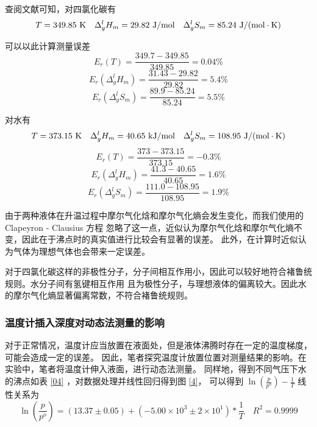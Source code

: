 \documentclass[cn,hazy,pku,12pt,normal,math=newtx,cite=super]{elegantnote}
\begin{document}
查阅文献\cite{Weast1988CRC}可知，对四氯化碳有
$$
T = 349.85\ {\rm K} \quad \Delta^l_g H_m = 29.82\ {\rm J/mol} \quad \Delta^l_g S_m = 85.24\ {\rm J/(mol\cdot K)}
$$

可以以此计算测量误差
$$
E_r(T) = \frac{349.7-349.85}{349.85} = 0.04 \%
$$
$$
E_r(\Delta^l_g H_m) = \frac{31.43-29.82}{29.82} = 5.4 \% 
$$
$$
E_r(\Delta^l_g S_m) = \frac{89.9 -85.24}{85.24} = 5.5 \% 
$$

对水有
$$
T = 373.15\ {\rm K} \quad \Delta^l_g H_m = 40.65\ {\rm kJ/mol} \quad \Delta^l_g S_m = 108.95\ {\rm J/(mol\cdot K)}
$$
$$
E_r(T) = \frac{373 - 373.15}{373.15} = -0.3 \%
$$
$$
E_r(\Delta^l_g H_m) = \frac{41.3-40.65}{40.65} = 1.6 \% 
$$
$$
E_r(\Delta^l_g S_m) = \frac{111.0-108.95}{108.95} = 1.9 \% 
$$

由于两种液体在升温过程中摩尔气化焓和摩尔气化熵会发生变化，而我们使用的 Clapeyron - Clausius 方程
忽略了这一点，近似认为摩尔气化焓和摩尔气化熵不变，因此在于沸点时的真实值进行比较会有显著的误差。
此外，在计算时近似认为气体为理想气体也会带来一定误差。

对于四氯化碳这样的非极性分子，分子间相互作用小，因此可以较好地符合褚鲁统规则。水分子间有氢键相互作用
且为极性分子，与理想液体的偏离较大。因此水的摩尔气化熵显著偏离常数，不符合褚鲁统规则。

\subsubsection{温度计插入深度对动态法测量的影响}

对于正常情况，温度计应当放置在液面处，但是液体沸腾时存在一定的温度梯度，可能会造成一定的误差。
因此，笔者探究温度计放置位置对测量结果的影响。在实验中，笔者将温度计伸入液面，进行动态法测量。
同样地，得到不同气压下水的沸点如表 \ref{04} ，对数据处理并线性回归得到图 \ref{4}，
可以得到 $\ln(\frac{p}{p^o}) - \frac{1}{T}$ 线性关系为
$$
\ln(\frac{p}{p^o}) = (13.37 \pm 0.05) + (-5.00 \times 10^3 \pm 2 \times 10^1) * \frac{1}{T} \quad R^2=0.9999
$$
\end{document}
